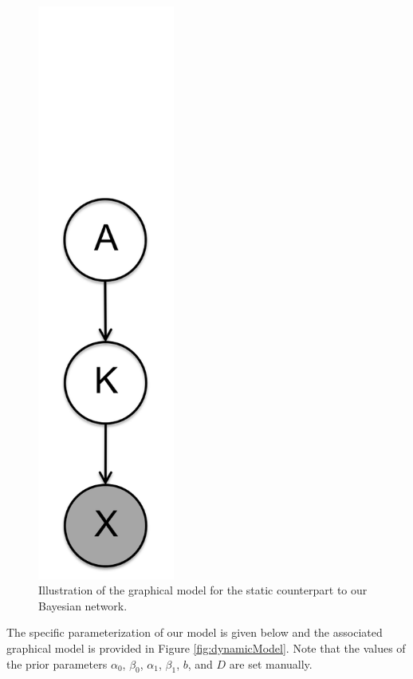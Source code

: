 \documentclass{article}
\begin{document}
\begin{figure}[tbp]
\begin{minipage}[c]{0.24\linewidth}
      \includegraphics[width=0.4\textwidth]{fig/static_ggm_model.png}
      \caption{Illustration of the graphical model for the static counterpart to our Bayesian network.}
      \label{fig:staticModel}
  \end{minipage}
\end{figure}

The specific parameterization of our model is given below and the associated graphical model is provided in Figure \ref{fig:dynamicModel}. Note that the values of the prior parameters $\alpha_0$, $\beta_0$, $\alpha_1$, $\beta_1$, $b$, and $D$ are set manually.
\end{document}

